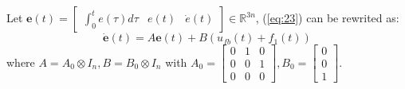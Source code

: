 \documentclass{ieeeaccess}
\begin{document}
Let $\pmb{e}(t)=\begin{bmatrix}
    \int_{0}^{t}e(\tau)d\tau & e(t) & \dot{e}(t)
\end{bmatrix}\in\mathbb{R}^{3n}$, (\ref{eq:23}) can be rewrited as:
\begin{equation} \label{eq:linear f1}
    \dot{\pmb{e}}(t)=A\pmb{e}(t)+B(u_{fb}(t)+f_1(t))
\end{equation}
where $ A = A_0\otimes I_n, B = B_0\otimes I_n$
with $A_0 = \begin{bmatrix}
    0 & 1 & 0 \\ 0 & 0 & 1 \\ 0 & 0 & 0
\end{bmatrix}, B_0 = \begin{bmatrix}
0 \\ 0 \\ 1
\end{bmatrix}$. 
\end{document}
